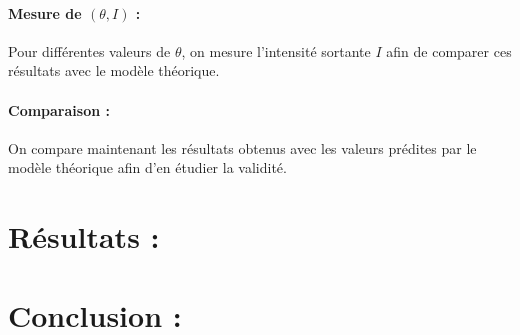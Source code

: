 \documentclass{article}
\begin{document}
\paragraph{Mesure de $(\theta, I)$ :} Pour différentes valeurs de $\theta$, on mesure l'intensité sortante $I$ afin de comparer ces résultats avec le modèle théorique.

\paragraph{Comparaison :} On compare maintenant les résultats obtenus avec les valeurs prédites par le modèle théorique afin d'en étudier la validité.

\section{Résultats :}

\section{Conclusion :}
\end{document}
